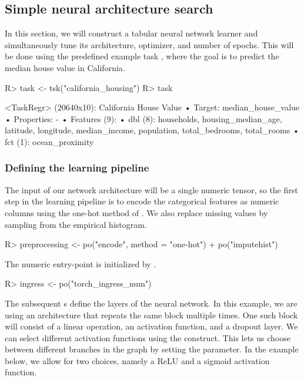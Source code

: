 \documentclass[article]{jss}
\theoremstyle{definition}
\begin{document}
\subsection{Simple neural architecture search}\label{sec:tuning}

In this section, we will construct a tabular neural network learner and simultaneously tune its architecture, optimizer, and number of epochs.
This will be done using the predefined  example task \citep{ref-pace1997sparse}, where the goal is to predict the median house value in California.

\begin{CodeInput}
R> task <- tsk("california_housing")
R> task
\end{CodeInput}
\begin{CodeOutput}
<TaskRegr> (20640x10): California House Value
• Target: median_house_value
• Properties: -
• Features (9):
  • dbl (8): households, housing_median_age, latitude, longitude,
  median_income, population, total_bedrooms, total_rooms
  • fct (1): ocean_proximity
\end{CodeOutput}

\subsubsection{Defining the learning pipeline}
The input of our network architecture will be a single numeric tensor, so the first step in the learning pipeline is to encode the categorical features as numeric columns using the one-hot method of .
We also replace missing values by sampling from the empirical histogram.

\begin{CodeInput}
R> preprocessing <- po("encode", method = "one-hot") %
+    po("imputehist")
\end{CodeInput}

The numeric entry-point is initialized by .

\begin{CodeInput}
R> ingress <- po("torch_ingress_num")
\end{CodeInput}

The subsequent s define the layers of the neural network.
In this example, we are using an architecture that repeats the same block multiple times.
One such block will consist of a linear operation, an activation function, and a dropout layer.
We can select different activation functions using the  construct.
This lets us choose between different branches in the graph by setting the  parameter.
In the example below, we allow for two choices, namely a ReLU and a sigmoid activation function.
\end{document}
